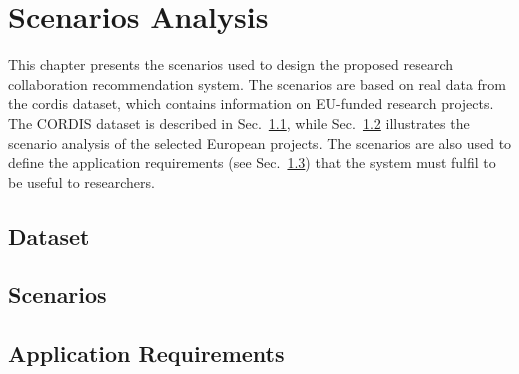 \chapter{Scenarios Analysis}\label{chap:scenarios-analysis}
This chapter presents the scenarios used to design the proposed research collaboration recommendation system.
The scenarios are based on real data from the \gls{cordis} dataset, which contains information on EU-funded research projects.
The CORDIS dataset is described in Sec.~\ref{sec:dataset}, while Sec.~\ref{sec:scenarios} illustrates the scenario analysis of the selected European projects.
The scenarios are also used to define the application requirements (see Sec.~\ref{sec:application-requirements}) that the system must fulfil to be useful to researchers.

\section{Dataset}\label{sec:dataset}


\section{Scenarios}\label{sec:scenarios}


\section{Application Requirements}\label{sec:application-requirements}
